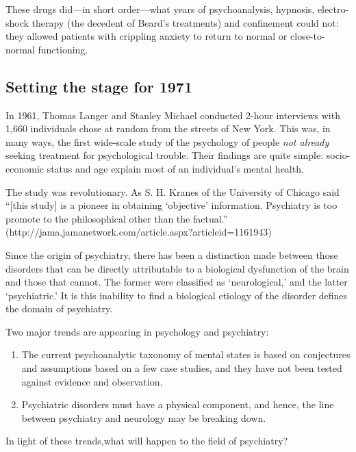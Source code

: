These drugs did---in short order---what years of psychoanalysis, hypnosis, electro-shock therapy (the decedent of Beard's treatments) and confinement could not: they allowed patients with crippling anxiety to return to normal or close-to-normal functioning.

\subsection{Setting the stage for 1971}
\label{settingthestagefor1971}

In 1961, Thomas Langer and Stanley Michael conducted 2-hour interviews with 1,660 individuals chose at random from the streets of New York. This was, in many ways, the first wide-scale study of the psychology of people \emph{not already} seeking treatment for psychological trouble. Their findings are quite simple: socio-economic status and age explain most of an individual's mental health. 

The study was revolutionary. As S. H. Kranes of the University of Chicago said ``[this study] is a pioneer in obtaining `objective' information. Psychiatry is too promote to the philosophical other than the factual.'' (http:\slash \slash jama.jamanetwork.com\slash article.aspx?articleid=1161943)

Since the origin of psychiatry, there has been a distinction made between those disorders that can be directly attributable to a biological dysfunction of the brain and those that cannot. The former were classified as `neurological,' and the latter `psychiatric.' It is this inability to find a biological etiology of the disorder defines the domain of psychiatry.

Two major trends are appearing in psychology and psychiatry: 

\begin{enumerate}
\item The current psychoanalytic taxonomy of mental states is based on conjectures and assumptions based on a few case studies, and they have not been tested against evidence and observation.

\item Psychiatric disorders must have a physical component, and hence, the line between psychiatry and neurology may be breaking down.

\end{enumerate}

In light of these trends,what will happen to the field of psychiatry?


